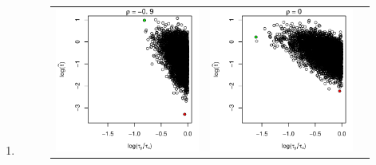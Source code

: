 \documentclass[10pt]{article}
\begin{document}
\begin{enumerate}
\item
 
  \begin{figure}
  \centering
  \begin{tabular}{ccc}
    \begin{minipage}{0.3\textwidth}
      \centering
      \includegraphics[width=1\linewidth]{small-sigma-t-scatterplot--09.pdf}
    \end{minipage}
    & \begin{minipage}{0.3\textwidth}
      \centering
      \includegraphics[width=1\linewidth]{small-sigma-t-scatterplot-0.pdf}

\end{minipage}
\end{tabular}
\end{figure}
\end{enumerate}
\end{document}

